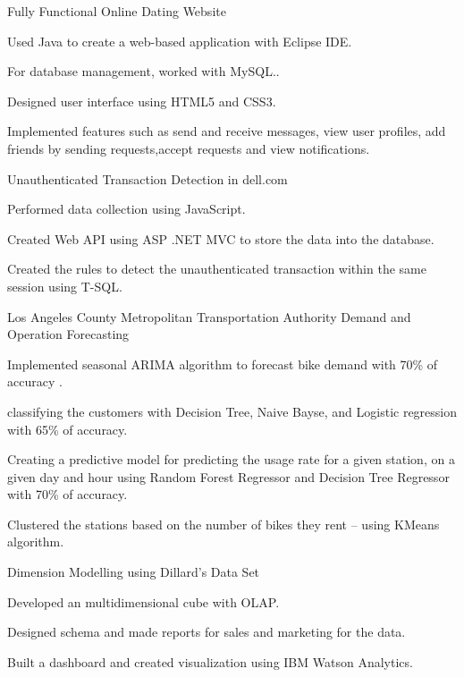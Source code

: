 \documentclass[10pt]{article}
\begin{document}
\headedsectionthree
{Fully Functional Online Dating Website}{}
{\href{}{\vspace{-2ex}}}
{\vspace{-2.4ex}
    \begin{circlist}
         \item  Used Java  to create a web-based application with Eclipse IDE.
	    \item For database management, worked with MySQL..
	    \item Designed user interface using HTML5 and CSS3.
	    \item Implemented features such as send and receive messages, view user profiles, add friends by sending requests,accept
requests and view notifications.
    \end{circlist}
}
\headedsectionthree
{Unauthenticated Transaction Detection in dell.com  }{}
{\href{}{\vspace{-2ex}}}
{\vspace{-2.4ex}
    \begin{circlist}
        \item Performed data collection using JavaScript.
        \item Created Web API using ASP .NET MVC to store the data into the database.
        \item Created the rules to detect the unauthenticated transaction within the same session using T-SQL.
    \end{circlist}
}
\headedsectionthree
{Los Angeles County Metropolitan Transportation Authority Demand and Operation Forecasting}{}
{\href{}{\vspace{-2ex}}}
{\vspace{-2.4ex}
    \begin{circlist}
	    \item Implemented seasonal ARIMA algorithm to forecast bike demand with 70\% of accuracy .
	    \item classifying the customers with Decision Tree, Naive Bayse, and Logistic regression with 65\% of accuracy.
	    \item Creating a predictive model for predicting the usage rate for a given station, on a given day and hour using Random Forest Regressor and Decision Tree Regressor with 70\% of accuracy.
	    \item Clustered the stations  based on the number of bikes they rent – using KMeans algorithm.
    \end{circlist}
}
\headedsectionthree
{Dimension Modelling using Dillard's Data Set}{}
{\href{}{\vspace{-2ex}}}
{\vspace{-2.4ex}
    \begin{circlist}
	    \item Developed an multidimensional cube with OLAP.
	    \item Designed schema and made reports for sales and marketing for the data.
	    \item Built a dashboard and created visualization using IBM Watson Analytics.
    \end{circlist}
}
\end{document}
